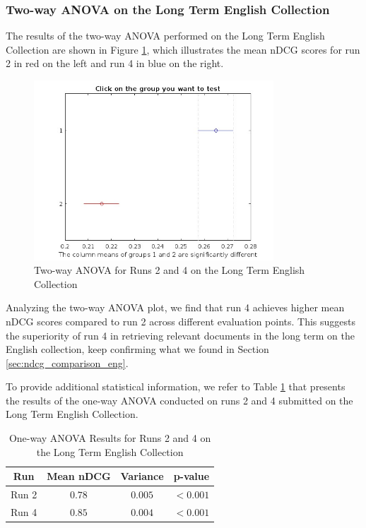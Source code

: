 \subsubsection{Two-way \ac{ANOVA} on the Long Term English Collection}

The results of the two-way \ac{ANOVA} performed on the Long Term English Collection are shown in Figure \ref{fig:lt_anova_eng}, which illustrates the mean \ac{nDCG} scores for run 2 in red on the left and run 4 in blue on the right. 

\begin{figure}[!h]
\centering
\includegraphics[width=0.8\textwidth]{figure/StatisticalAnalysis/AnovaTwoWay/LT_EN.jpg}
\caption{Two-way ANOVA for Runs 2 and 4 on the Long Term English Collection}
\label{fig:lt_anova_eng}
\end{figure}

Analyzing the two-way \ac{ANOVA} plot, we find that run 4 achieves higher mean \ac{nDCG} scores compared to run 2 across different evaluation points. 
This suggests the superiority of run 4 in retrieving relevant documents in the long term on the English collection, keep confirming what we found in Section \ref{sec:ndcg_comparison_eng}. 

To provide additional statistical information, we refer to Table \ref{table:lt_anova_eng} that presents the results of the one-way \ac{ANOVA} conducted on runs 2 and 4 submitted on the Long Term English Collection.

\begin{table}[!h]
\centering
\caption{One-way \ac{ANOVA} Results for Runs 2 and 4 on the Long Term English Collection}
\label{table:lt_anova_eng}
\begin{tabular}{cccc}
\toprule
\textbf{Run} & \textbf{Mean nDCG} & \textbf{Variance} & \textbf{p-value} \\
\midrule
Run 2 & $0.78$ & $0.005$ & $<0.001$ \\
Run 4 & $0.85$ & $0.004$ & $<0.001$ \\
\bottomrule
\end{tabular}
\end{table}

